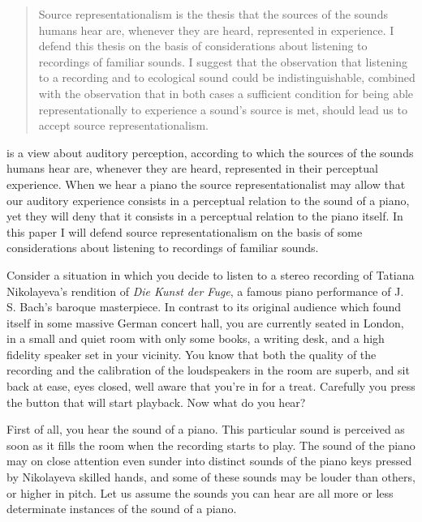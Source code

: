 \documentclass[sloppy, journal, git, bytitle, dodraft]{humapap}
\begin{document}
\documenttitle

\begin{abstract}
Source representationalism is the thesis that the sources of the sounds humans hear are, whenever they are heard, represented in experience. I defend this thesis on the basis of considerations about listening to recordings of familiar sounds. I suggest that the observation that listening to a recording and to ecological sound could be indistinguishable, combined with the observation that in both cases a sufficient condition for being able representationally to experience a sound's source is met, should lead us to accept source representationalism.
\end{abstract}	

 is a view about auditory perception, according to which the sources of the sounds humans hear are, whenever they are heard, represented in their perceptual experience. When we hear a piano the source representationalist may allow that our auditory experience consists in a perceptual relation to the sound of a piano, yet they will deny that it consists in a perceptual relation to the piano itself. In this paper I will defend source representationalism on the basis of some considerations about listening to recordings of familiar sounds.

\sect Consider a situation in which you decide to listen to a stereo recording of Tatiana Nikolayeva's rendition of \emph{Die Kunst der Fuge}, a famous piano performance of J. S. Bach's baroque masterpiece. In contrast to its original audience which found itself in some massive German concert hall, you are currently seated in London, in a small and quiet room with only some books, a writing desk, and a high fidelity speaker set in your vicinity. You know that both the quality of the recording and the calibration of the loudspeakers in the room are superb, and sit back at ease, eyes closed, well aware that you're in for a treat. Carefully you press the button that will start playback. Now what do you hear? 

\sect First of all, you hear the sound of a piano. This particular sound is perceived as soon as it fills the room when the recording starts to play. The sound of the piano may on close attention even sunder into distinct sounds of the piano keys pressed by Nikolayeva skilled hands, and some of these sounds may be louder than others, or higher in pitch. Let us assume the sounds you can hear are all more or less determinate instances of the sound of a piano.
\end{document}
